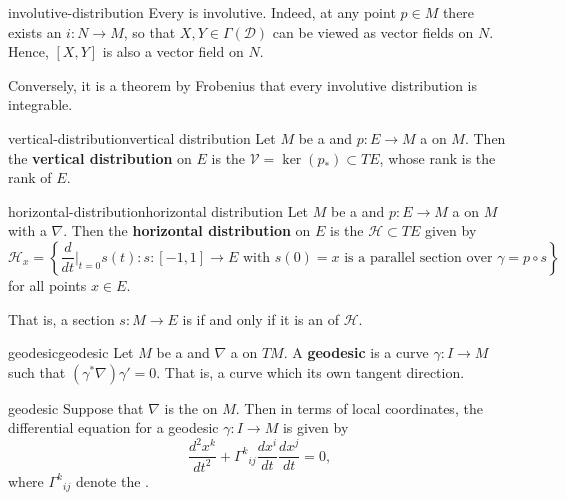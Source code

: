 \begin{example}{involutive-distribution}
    Every  is involutive. Indeed, at any point $p \in M$ there exists an  $i : N \to M$, so that $X, Y \in \Gamma(\mathcal{D})$ can be viewed as vector fields on $N$. Hence, $[X, Y]$ is also a vector field on $N$.
    
    Conversely, it is a theorem by Frobenius that every involutive distribution is integrable.
\end{example}

\begin{topic}{vertical-distribution}{vertical distribution}
    Let $M$ be a  and $p : E \to M$ a  on $M$. Then the \textbf{vertical distribution} on $E$ is the  $\mathcal{V} = \ker(p_*) \subset TE$, whose rank is the rank of $E$.
\end{topic}

\begin{topic}{horizontal-distribution}{horizontal distribution}
    Let $M$ be a  and $p : E \to M$ a  on $M$ with a  $\nabla$. Then the \textbf{horizontal distribution} on $E$ is the  $\mathcal{H} \subset TE$ given by
    \[ \mathcal{H}_x = \left\{ \frac{d}{dt}\Big|_{t = 0} s(t) : s : [-1, 1] \to E \text{ with } s(0) = x \text{ is a parallel section over } \gamma = p \circ s \right\} \]
    for all points $x \in E$.
    
    That is, a section $s : M \to E$ is  if and only if it is an  of $\mathcal{H}$.
\end{topic}

\begin{topic}{geodesic}{geodesic}
    Let $M$ be a  and $\nabla$ a  on $TM$. A \textbf{geodesic} is a curve $\gamma : I \to M$ such that $(\gamma^* \nabla) \gamma' = 0$. That is, a curve which  its own tangent direction.
\end{topic}

\begin{example}{geodesic}
    Suppose that $\nabla$ is the  on $M$. Then in terms of local coordinates, the differential equation for a geodesic $\gamma : I \to M$ is given by
    \[ \frac{d^2 x^k}{d t^2} + {\Gamma^k}_{ij} \frac{dx^i}{dt} \frac{dx^j}{dt} = 0 , \]
    where ${\Gamma^k}_{ij}$ denote the .
\end{example}


